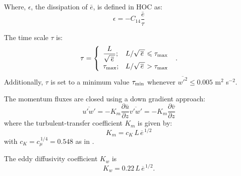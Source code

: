 \documentclass[11pt,fleqn]{article}
\newcommand{\ptlder}[2]{\frac{\partial #1}{\partial #2}}
\begin{document}
Where, $\epsilon$, the dissipation of $\bar{e}$, is defined in HOC as:
\begin{equation}
\epsilon = -C_{14} \frac{\bar{e}}{\tau}
\end{equation}

The time scale $\tau$ is:
%
\begin{equation}
\label{eq_tau}
\tau = \left\{
\begin{array}{ll}
\displaystyle \frac{L}{\sqrt{\, \overline{e} \,}}; 
& L / \sqrt{\, \overline{e} \,} \leqslant \tau_{\rm max} \\
\displaystyle \tau_{\rm max};
&  L / \sqrt{\, \overline{e} \,} > \tau_{\rm max}
\end{array}
\right. \hbox{ .}
\end{equation}
%
Additionally, $\tau$ is set to a minimum value $\tau_{\rm min}$
whenever $\overline{w'^2} \leqslant 0.005$ m$^2$ s$^{-2}$.

The momentum fluxes are closed using a down gradient approach:
%
\begin{subequations}
\begin{equation}
\label{eq_upwp}
\overline{u'w'} = -K_m \ptlder{\bar{u}}{z}
\end{equation}
%
\begin{equation}
\label{eq_vpwp}
\overline{v'w'} = -K_m \ptlder{\bar{v}}{z}
\end{equation}
\end{subequations}
%
where the turbulent-transfer coefficient $K_m$ is given by:
%
\begin{equation}
\label{eq_Km}
K_m = c_K \, L \, \overline{e}^{\, 1/2}
\end{equation}
%
with $c_K = c_{\mu}^{\, 1/4} = 0.548$ as in \citet{duynkerke1987a}.

The eddy diffusivity coefficient $K_w$ is
%
\begin{equation}
\label{eq_Kw}
K_w = 0.22 \, L \, \overline{e}^{\, 1/2}.
\end{equation}
\end{document}
